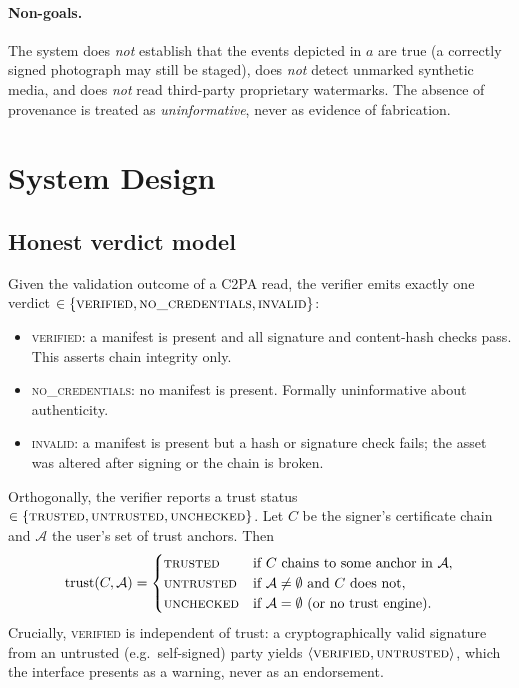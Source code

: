 \documentclass[11pt]{article}
\newcommand{\state}[1]{\textsc{#1}}
\begin{document}
\paragraph{Non-goals.} The system does \emph{not} establish that the events depicted in $a$
are true (a correctly signed photograph may still be staged), does \emph{not} detect
unmarked synthetic media, and does \emph{not} read third-party proprietary watermarks. The
absence of provenance is treated as \emph{uninformative}, never as evidence of fabrication.

\section{System Design}\label{sec:design}
\subsection{Honest verdict model}
Given the validation outcome of a C2PA read, the verifier emits exactly one verdict
$\in \{\state{verified}, \state{no\_credentials}, \state{invalid}\}$:
\begin{itemize}[noitemsep]
\item \state{verified}: a manifest is present and all signature and content-hash checks
pass. This asserts chain integrity only.
\item \state{no\_credentials}: no manifest is present. Formally uninformative about
authenticity.
\item \state{invalid}: a manifest is present but a hash or signature check fails; the asset
was altered after signing or the chain is broken.
\end{itemize}
Orthogonally, the verifier reports a trust status
$\in \{\state{trusted}, \state{untrusted}, \state{unchecked}\}$. Let $C$ be the signer's
certificate chain and $\mathcal{A}$ the user's set of trust anchors. Then
\[
\text{trust}(C,\mathcal{A}) =
\begin{cases}
\state{trusted} & \text{if } C \text{ chains to some anchor in } \mathcal{A},\\
\state{untrusted} & \text{if } \mathcal{A}\neq\emptyset \text{ and } C \text{ does not},\\
\state{unchecked} & \text{if } \mathcal{A}=\emptyset \text{ (or no trust engine)}.
\end{cases}
\]
Crucially, \state{verified} is independent of trust: a cryptographically valid signature
from an untrusted (e.g.\ self-signed) party yields $\langle\state{verified},
\state{untrusted}\rangle$, which the interface presents as a warning, never as an
endorsement.
\end{document}
